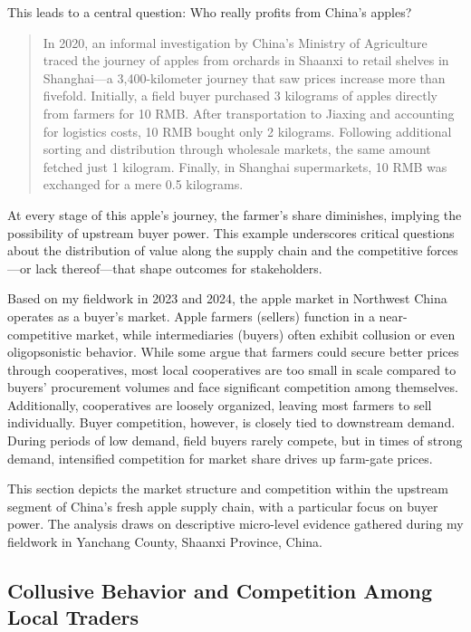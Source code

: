 This leads to a central question: Who really profits from China’s apples?

\begin{quote}
    In 2020, an informal investigation by China’s Ministry of Agriculture traced the journey of apples from orchards in Shaanxi to retail shelves in Shanghai—a 3,400-kilometer journey that saw prices increase more than fivefold. Initially, a field buyer purchased 3 kilograms of apples directly from farmers for 10 RMB. After transportation to Jiaxing and accounting for logistics costs, 10 RMB bought only 2 kilograms. Following additional sorting and distribution through wholesale markets, the same amount fetched just 1 kilogram. Finally, in Shanghai supermarkets, 10 RMB was exchanged for a mere 0.5 kilograms.
\end{quote}

At every stage of this apple's journey, the farmer’s share diminishes, implying the possibility of upstream buyer power. This example underscores critical questions about the distribution of value along the supply chain and the competitive forces—or lack thereof—that shape outcomes for stakeholders.

Based on my fieldwork in 2023 and 2024, the apple market in Northwest China operates as a buyer's market. Apple farmers (sellers) function in a near-competitive market, while intermediaries (buyers) often exhibit collusion or even oligopsonistic behavior. While some argue that farmers could secure better prices through cooperatives, most local cooperatives are too small in scale compared to buyers' procurement volumes and face significant competition among themselves. Additionally, cooperatives are loosely organized, leaving most farmers to sell individually. Buyer competition, however, is closely tied to downstream demand. During periods of low demand, field buyers rarely compete, but in times of strong demand, intensified competition for market share drives up farm-gate prices.

This section depicts the market structure and competition within the upstream segment of China's fresh apple supply chain, with a particular focus on buyer power. The analysis draws on descriptive micro-level evidence gathered during my fieldwork in Yanchang County, Shaanxi Province, China.



\subsection{Collusive Behavior and Competition Among Local Traders}

